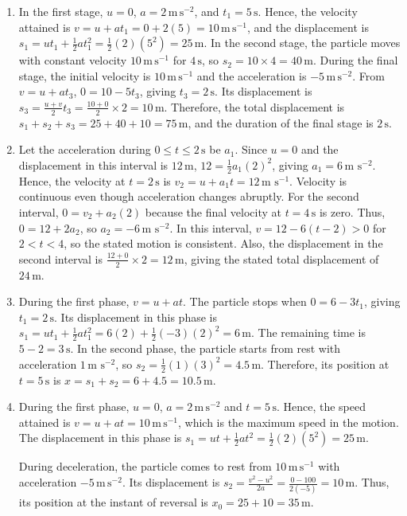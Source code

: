 \documentclass[11pt,a4paper]{article}
\begin{document}
\begin{enumerate}
\item In the first stage, $u=0$, $a=2\,\mathrm{m\,s^{-2}}$, and $t_1=5\,\mathrm{s}$. Hence, the velocity attained is $v=u+at_1=0+2(5)=10\,\mathrm{m\,s^{-1}}$, and the displacement is $s_1=ut_1+\frac{1}{2}at_1^2=\frac{1}{2}(2)(5^2)=25\,\mathrm{m}$. In the second stage, the particle moves with constant velocity $10\,\mathrm{m\,s^{-1}}$ for $4\,\mathrm{s}$, so $s_2=10\times4=40\,\mathrm{m}$. During the final stage, the initial velocity is $10\,\mathrm{m\,s^{-1}}$ and the acceleration is $-5\,\mathrm{m\,s^{-2}}$. From $v=u+at_3$, $0=10-5t_3$, giving $t_3=2\,\mathrm{s}$. Its displacement is $s_3=\frac{u+v}{2}t_3=\frac{10+0}{2}\times2=10\,\mathrm{m}$. Therefore, the total displacement is $s_1+s_2+s_3=25+40+10=75\,\mathrm{m}$, and the duration of the final stage is $2\,\mathrm{s}$.
\item Let the acceleration during $0\le t\le2\,\text{s}$ be $a_1$. Since $u=0$ and the displacement in this interval is $12\,\text{m}$, $12=\frac12a_1(2)^2$, giving $a_1=6\,\text{m s}^{-2}$. Hence, the velocity at $t=2\,\text{s}$ is $v_2=u+a_1t=12\,\text{m s}^{-1}$. Velocity is continuous even though acceleration changes abruptly. For the second interval, $0=v_2+a_2(2)$ because the final velocity at $t=4\,\text{s}$ is zero. Thus, $0=12+2a_2$, so $a_2=-6\,\text{m s}^{-2}$. In this interval, $v=12-6(t-2)>0$ for $2<t<4$, so the stated motion is consistent. Also, the displacement in the second interval is $\frac{12+0}{2}\times2=12\,\text{m}$, giving the stated total displacement of $24\,\text{m}$.
\item During the first phase, \(v=u+a t\). The particle stops when \(0=6-3t_1\), giving \(t_1=2\,\text{s}\). Its displacement in this phase is \(s_1=ut_1+\frac12at_1^2=6(2)+\frac12(-3)(2)^2=6\,\text{m}\). The remaining time is \(5-2=3\,\text{s}\). In the second phase, the particle starts from rest with acceleration \(1\,\text{m s}^{-2}\), so \(s_2=\frac12(1)(3)^2=4.5\,\text{m}\). Therefore, its position at \(t=5\,\text{s}\) is \(x=s_1+s_2=6+4.5=10.5\,\text{m}\).
\item During the first phase, $u=0$, $a=2\,\mathrm{m\,s^{-2}}$ and $t=5\,\mathrm{s}$. Hence, the speed attained is $v=u+at=10\,\mathrm{m\,s^{-1}}$, which is the maximum speed in the motion. The displacement in this phase is $s_1=ut+\frac12at^2=\frac12(2)(5^2)=25\,\mathrm{m}$.\

During deceleration, the particle comes to rest from $10\,\mathrm{m\,s^{-1}}$ with acceleration $-5\,\mathrm{m\,s^{-2}}$. Its displacement is $s_2=\frac{v^2-u^2}{2a}=\frac{0-100}{2(-5)}=10\,\mathrm{m}$. Thus, its position at the instant of reversal is $x_0=25+10=35\,\mathrm{m}$.\


\end{enumerate}
\end{document}
